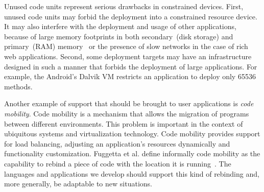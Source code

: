 %
%

Unused code units represent serious drawbacks in constrained devices. 
First, unused code units may forbid the deployment into a constrained resource device.
It may also interfere with the deployment and usage of other applications, because of large memory footprints in both secondary~(disk storage) and primary~(RAM) memory~\cite{Mart12a} or the presence of slow networks in the case of rich web applications.
Second, some deployment targets may have an infrastructure designed in such a manner that forbids the deployment of large applications. For example, the Android's Dalvik VM restricts an application to deploy only 65536 methods.




Another example of support that should be brought to user applications is \emph{code mobility}. Code mobility is a mechanism that allows the migration of programs between different environments. This problem is important in the context of ubiquitous systems and virtualization technology. Code mobility provides support for \eg load balancing, adjusting an application's resources dynamically and functionality customization. Fuggetta et al. define informally code mobility as the capability to rebind a piece of code with the location it is running~\cite{Fugg98a}. The languages and applications we develop should support this kind of rebinding and, more generally, be adaptable to new situations.


